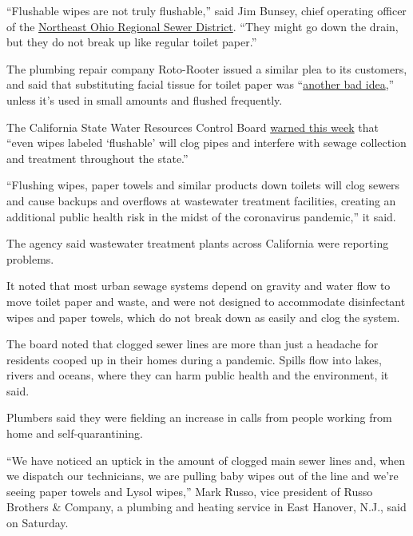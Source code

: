 ``Flushable wipes are not truly flushable,'' said Jim Bunsey, chief
operating officer of the
\href{https://medium.com/@neorsd/important-reminder-wipes-clog-pipes-91d173195f65}{Northeast
Ohio Regional Sewer District}. ``They might go down the drain, but they
do not break up like regular toilet paper.''

The plumbing repair company Roto-Rooter issued a similar plea to its
customers, and said that substituting facial tissue for toilet paper was
``\href{http://view.exacttarget.com/?qs=dcbe0a06ae64c47901e4e08e738e178fe4c78b93c2932c6af35225dbdf1741d0a62043887fad5f9afc903d2f5a9287456ead6fca47c874c3934144e70a11c5a50d65290c618d5e1d35927892c3e6308d}{another
bad idea},'' unless it's used in small amounts and flushed frequently.

The California State Water Resources Control Board
\href{https://www.waterboards.ca.gov/press_room/press_releases/2020/pr03172020_products_clogging_sanitation.pdf}{warned
this week} that ``even wipes labeled `flushable' will clog pipes and
interfere with sewage collection and treatment throughout the state.''

``Flushing wipes, paper towels and similar products down toilets will
clog sewers and cause backups and overflows at wastewater treatment
facilities, creating an additional public health risk in the midst of
the coronavirus pandemic,'' it said.

The agency said wastewater treatment plants across California were
reporting problems.

It noted that most urban sewage systems depend on gravity and water flow
to move toilet paper and waste, and were not designed to accommodate
disinfectant wipes and paper towels, which do not break down as easily
and clog the system.

The board noted that clogged sewer lines are more than just a headache
for residents cooped up in their homes during a pandemic. Spills flow
into lakes, rivers and oceans, where they can harm public health and the
environment, it said.

Plumbers said they were fielding an increase in calls from people
working from home and self-quarantining.

``We have noticed an uptick in the amount of clogged main sewer lines
and, when we dispatch our technicians, we are pulling baby wipes out of
the line and we're seeing paper towels and Lysol wipes,'' Mark Russo,
vice president of Russo Brothers \& Company, a plumbing and heating
service in East Hanover, N.J., said on Saturday.

